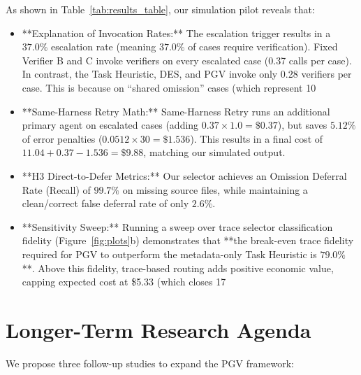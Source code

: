 \documentclass[manuscript,screen,nonacm]{acmart}
\newcommand{\BreakEvenFidelity}{79.0}
\newcommand{\OmissionDeferRecall}{99.7}
\newcommand{\CleanFalseDeferral}{2.6}
\begin{document}
As shown in Table~\ref{tab:results_table}, our simulation pilot reveals that:
\begin{itemize}
    \item **Explanation of Invocation Rates:** The escalation trigger results in a $37.0\%$ escalation rate (meaning $37.0\%$ of cases require verification). Fixed Verifier B and C invoke verifiers on every escalated case (0.37 calls per case). In contrast, the Task Heuristic, DES, and PGV invoke only 0.28 verifiers per case. This is because on ``shared omission'' cases (which represent 10%
    \item **Same-Harness Retry Math:** Same-Harness Retry runs an additional primary agent on escalated cases (adding $0.37 \times 1.0 = \$0.37$), but saves $5.12\%$ of error penalties ($0.0512 \times 30 = \$1.536$). This results in a final cost of $11.04 + 0.37 - 1.536 = \$9.88$, matching our simulated output.
    \item **H3 Direct-to-Defer Metrics:** Our selector achieves an Omission Deferral Rate (Recall) of $\OmissionDeferRecall\%$ on missing source files, while maintaining a clean/correct false deferral rate of only $\CleanFalseDeferral\%$.
    \item **Sensitivity Sweep:** Running a sweep over trace selector classification fidelity (Figure~\ref{fig:plots}b) demonstrates that **the break-even trace fidelity required for PGV to outperform the metadata-only Task Heuristic is $\BreakEvenFidelity\%$**. Above this fidelity, trace-based routing adds positive economic value, capping expected cost at \$5.33 (which closes 17%
\end{itemize}

\section{Longer-Term Research Agenda}
\label{sec:agenda}

We propose three follow-up studies to expand the PGV framework:
\end{document}
